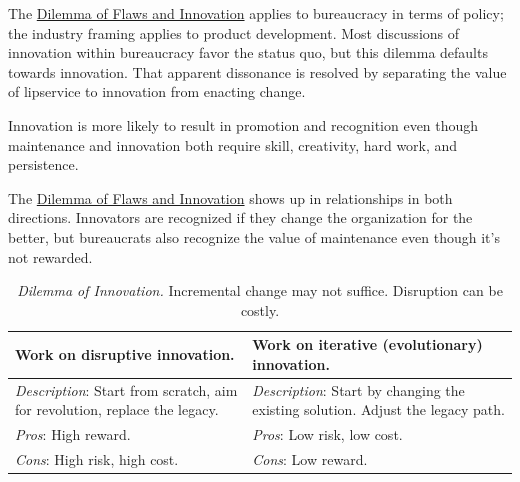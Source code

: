 The \hyperref[table:dilemma-personal-flaws-and-innovation]{Dilemma of Flaws and Innovation} applies to bureaucracy in terms of policy; the industry framing applies to product development. Most discussions of innovation within bureaucracy favor the status quo, but this dilemma defaults towards innovation. That apparent dissonance is resolved by separating the value of lipservice to innovation from enacting change.

Innovation is more likely to result in promotion and recognition even though maintenance and innovation both require skill, creativity, hard work, and persistence. 

The \hyperref[table:dilemma-personal-flaws-and-innovation]{Dilemma of Flaws and Innovation} shows up in relationships in both directions. Innovators are recognized if they change the organization for the better, but bureaucrats also recognize the value of maintenance even though it's not rewarded. 


\begin{center}
\begin{table}[H] %
\begin{tabular}{ | m{\dilemmatablewidth}| m{\dilemmatablewidth} | } 
  \hline
  \textbf{Work on disruptive innovation.} &
  \textbf{Work on iterative (evolutionary) innovation.} \\
  \hline
  \textit{Description}: Start from scratch, aim for revolution, replace the legacy.  &
  \textit{Description}: Start by changing the existing solution. Adjust the legacy path.  \\  
  \hline
  \textit{Pros}: High reward. & 
  \textit{Pros}: Low risk, low cost. \\
  \hline
  \textit{Cons}: High risk, high cost. & 
  \textit{Cons}: Low reward. \\
  \hline
\end{tabular}
\caption{\textit{Dilemma of Innovation.}
Incremental change may not suffice. Disruption can be costly.
}
\label{table:dilemma-personal-disruptive-or-iterative}
\end{table}
\end{center}

